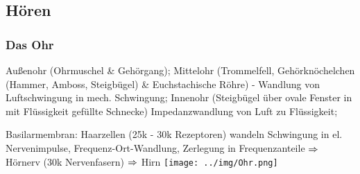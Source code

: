 \documentclass[german,color,6pt]{latex4ei/latex4ei_sheet}
\begin{document}

\subsection{Hören}

\begin{sectionbox}
\subsubsection{Das Ohr}
 Außenohr (Ohrmuschel \& Gehörgang); Mittelohr (Trommelfell, Gehörknöchelchen (Hammer, Amboss, Steigbügel) \& Euchstachische Röhre) - Wandlung von Luftschwingung in mech. Schwingung; Innenohr (Steigbügel über ovale Fenster in mit Flüssigkeit gefüllte Schnecke) Impedanzwandlung von Luft zu Flüssigkeit; 

Basilarmembran: Haarzellen (25k - 30k Rezeptoren) wandeln Schwingung in el. Nervenimpulse, Frequenz-Ort-Wandlung, Zerlegung in Frequenzanteile $\Rightarrow$ Hörnerv (30k Nervenfasern) $\Rightarrow$ Hirn
\texttt{[image: ../img/Ohr.png]}
\end{sectionbox}
\end{document}
